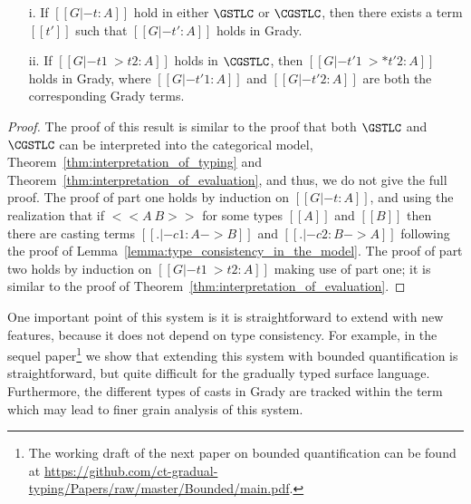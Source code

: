 \begin{lemma}[Translations]
  \label{lemma:translations}
  \begin{center}
    \begin{itemize}
    \item[] 
    \item[i.] If $[[G |- t : A]]$ hold in either $\GSTLC$ or
      $\CGSTLC$, then there exists a term
      $[[t']]$ such that $[[G |- t' : A]]$ holds in Grady.
    \item[ii.] If $[[G |- t1 ~> t2 : A]]$ holds in $\CGSTLC$, then
      $[[G |- t'1 ~>* t'2 : A]]$ holds in Grady, where $[[G |- t'1 :
        A]]$ and $[[G |- t'2 : A]]$ are both the corresponding Grady
      terms.
    \end{itemize}
  \end{center}
\end{lemma}
\begin{proof}
  The proof of this result is similar to the proof that both
  $\GSTLC$ and $\CGSTLC$ can be
  interpreted into the categorical model,
  Theorem~\ref{thm:interpretation_of_typing} and
  Theorem~\ref{thm:interpretation_of_evaluation}, and thus, we do not
  give the full proof.  The proof of part one holds by induction on
  $[[G |- t : A]]$, and using the realization that if $<<A ~ B>>$ for
  some types $[[A]]$ and $[[B]]$ then there are casting terms $[[. |-
      c1 : A -> B]]$ and $[[. |- c2 : B -> A]]$ following the proof of
  Lemma~\ref{lemma:type_consistency_in_the_model}. The proof of part
  two holds by induction on $[[G |- t1 ~> t2 : A]]$ making use of part
  one; it is similar to the proof of
  Theorem~\ref{thm:interpretation_of_evaluation}.
\end{proof}

One important point of this system is it is straightforward to extend
with new features, because it does not depend on type consistency.
For example, in the sequel paper\footnote{The working draft of the
  next paper on bounded quantification can be found at
  \url{https://github.com/ct-gradual-typing/Papers/raw/master/Bounded/main.pdf}.}
we show that extending this system with bounded quantification is
straightforward, but quite difficult for the gradually typed surface
language.  Furthermore, the different types of casts in Grady are
tracked within the term which may lead to finer grain analysis of this
system.

